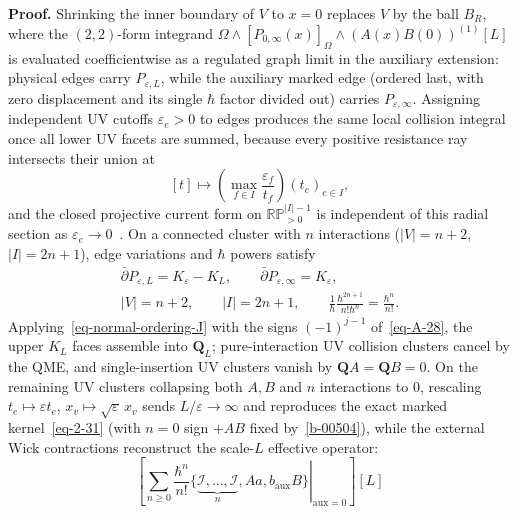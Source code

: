 \documentclass[11pt]{article}
\numberwithin{equation}{section}
\numberwithin{figure}{section}
\numberwithin{table}{section}
\begin{document}
\begin{proofbox}
\textbf{Proof.} Shrinking the inner boundary of $V$ to $x=0$ replaces $V$ by the ball $B_R$, where the $(2,2)$-form integrand $\Omega\wedge[P_{0,\infty}(x)]_\Omega\wedge(A(x)B(0))^{(1)}[L]$ is evaluated coefficientwise as a regulated graph limit in the auxiliary extension: physical edges carry $P_{\varepsilon,L}$, while the auxiliary marked edge (ordered last, with zero displacement and its single $\hbar$ factor divided out) carries $P_{\varepsilon,\infty}$. Assigning independent UV cutoffs $\varepsilon_e>0$ to edges produces the same local collision integral once all lower UV facets are summed, because every positive resistance ray intersects their union at
\begin{equation}\label{eq-independent-cutoff-section}
[t]\longmapsto\left(\max_{f\in I}\frac{\varepsilon_f}{t_f}\right)(t_e)_{e\in I},
\end{equation}
and the closed projective current form on $\mathbb{RP}_{>0}^{|I|-1}$ is independent of this radial section as $\varepsilon_e\to0$~\cite[Theorem 6]{Wang}. On a connected cluster with $n$ interactions ($|V|=n+2$, $|I|=2n+1$), edge variations and $\hbar$ powers satisfy
\begin{equation}\label{eq-normal-ordering-J}
\begin{gathered}
\bar\partial P_{\varepsilon,L}=K_\varepsilon-K_L,
\qquad \bar\partial P_{\varepsilon,\infty}=K_\varepsilon,\\
|V|=n+2,\qquad |I|=2n+1,\qquad
\frac1\hbar\frac{\hbar^{2n+1}}{n!\hbar^n}=\frac{\hbar^n}{n!}.
\end{gathered}
\end{equation}
Applying~\eqref{eq-normal-ordering-J} with the signs $(-1)^{j-1}$ of~\eqref{eq-A-28}, the upper $K_L$ faces assemble into $\mathbf Q_L$; pure-interaction UV collision clusters cancel by the QME, and single-insertion UV clusters vanish by $\mathbf QA=\mathbf QB=0$. On the remaining UV clusters collapsing both $A,B$ and $n$ interactions to $0$, rescaling $t_e\mapsto\varepsilon t_e$, $x_v\mapsto\sqrt\varepsilon\,x_v$ sends $L/\varepsilon\to\infty$ and reproduces the exact marked kernel~\eqref{eq-2-31} (with $n=0$ sign $+AB$ fixed by~\eqref{b-00504}), while the external Wick contractions reconstruct the scale-$L$ effective operator:
\begin{equation}\label{eq-normal-ordering-smeared}
\left[
\left.\sum_{n\ge0}\frac{\hbar^n}{n!}
\bigl\{\underbrace{\mathcal I,\ldots,\mathcal I}_{n},Aa,b_{\mathrm{aux}}B\bigr\}
\right|_{\mathrm{aux}=0}
\right][L]

\end{equation}
\end{proofbox}
\end{document}
